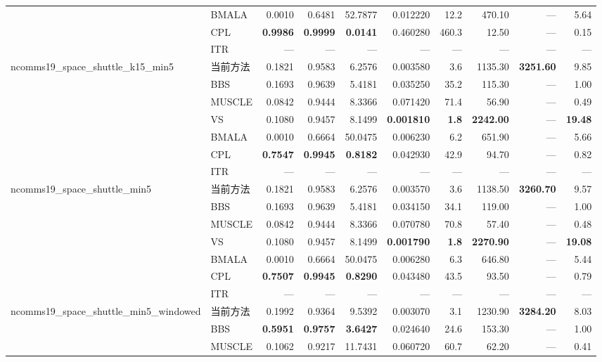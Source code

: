 \begin{table}[htbp]
\begin{tabular}{llrrrrrrrr}
 & BMALA & 0.0010 & 0.6481 & 52.7877 & 0.012220 & 12.2 & 470.10 & — & 5.64 \\
 & CPL & \textbf{0.9986} & \textbf{0.9999} & \textbf{0.0141} & 0.460280 & 460.3 & 12.50 & — & 0.15 \\
 & ITR & — & — & — & — & — & — & — & — \\
\midrule
\multirow{7}{*}{ncomms19\_space\_shuttle\_k15\_min5} & 当前方法 & 0.1821 & 0.9583 & 6.2576 & 0.003580 & 3.6 & 1135.30 & \textbf{3251.60} & 9.85 \\
 & BBS & 0.1693 & 0.9639 & 5.4181 & 0.035250 & 35.2 & 115.30 & — & 1.00 \\
 & MUSCLE & 0.0842 & 0.9444 & 8.3366 & 0.071420 & 71.4 & 56.90 & — & 0.49 \\
 & VS & 0.1080 & 0.9457 & 8.1499 & \textbf{0.001810} & \textbf{1.8} & \textbf{2242.00} & — & \textbf{19.48} \\
 & BMALA & 0.0010 & 0.6664 & 50.0475 & 0.006230 & 6.2 & 651.90 & — & 5.66 \\
 & CPL & \textbf{0.7547} & \textbf{0.9945} & \textbf{0.8182} & 0.042930 & 42.9 & 94.70 & — & 0.82 \\
 & ITR & — & — & — & — & — & — & — & — \\
\midrule
\multirow{7}{*}{ncomms19\_space\_shuttle\_min5} & 当前方法 & 0.1821 & 0.9583 & 6.2576 & 0.003570 & 3.6 & 1138.50 & \textbf{3260.70} & 9.57 \\
 & BBS & 0.1693 & 0.9639 & 5.4181 & 0.034150 & 34.1 & 119.00 & — & 1.00 \\
 & MUSCLE & 0.0842 & 0.9444 & 8.3366 & 0.070780 & 70.8 & 57.40 & — & 0.48 \\
 & VS & 0.1080 & 0.9457 & 8.1499 & \textbf{0.001790} & \textbf{1.8} & \textbf{2270.90} & — & \textbf{19.08} \\
 & BMALA & 0.0010 & 0.6664 & 50.0475 & 0.006280 & 6.3 & 646.80 & — & 5.44 \\
 & CPL & \textbf{0.7507} & \textbf{0.9945} & \textbf{0.8290} & 0.043480 & 43.5 & 93.50 & — & 0.79 \\
 & ITR & — & — & — & — & — & — & — & — \\
\midrule
\multirow{7}{*}{ncomms19\_space\_shuttle\_min5\_windowed} & 当前方法 & 0.1992 & 0.9364 & 9.5392 & 0.003070 & 3.1 & 1230.90 & \textbf{3284.20} & 8.03 \\
 & BBS & \textbf{0.5951} & \textbf{0.9757} & \textbf{3.6427} & 0.024640 & 24.6 & 153.30 & — & 1.00 \\
 & MUSCLE & 0.1062 & 0.9217 & 11.7431 & 0.060720 & 60.7 & 62.20 & — & 0.41 \\

\end{tabular}
\end{table}
